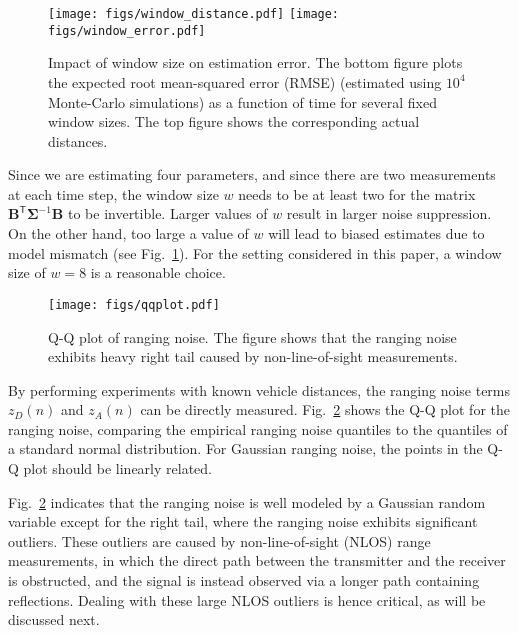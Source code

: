 \documentclass[12pt,journal,final,onecolumn]{IEEEtran}
\newcommand{\msf}[1]{\mathsf{#1}}
\newcommand{\T}{\msf{T}}
\theoremstyle{definition}
\theoremstyle{myremark}
\begin{document}
\begin{figure}[htbp]
    \centering 
    \texttt{[image: figs/window\_distance.pdf]} 
    \texttt{[image: figs/window\_error.pdf]} 

    \caption{Impact of window size on estimation error. The bottom figure plots
        the expected root mean-squared error (RMSE) (estimated using $10^4$
        Monte-Carlo simulations) as a function of time for several fixed window
        sizes. The top figure shows the corresponding actual distances.}
    \label{fig:window}
\end{figure}

Since we are estimating four parameters, and since there are two measurements at
each time step, the window size $w$ needs to be at least two for the matrix
$\bm{B}^\T\bm{\Sigma}^{-1}\bm{B}$ to be invertible. Larger values of $w$ result
in larger noise suppression. On the other hand, too large a value of $w$ will
lead to biased estimates due to model mismatch (see Fig.~\ref{fig:window}). For
the setting considered in this paper, a window size of $w = 8$ is a reasonable
choice.

\begin{figure}[htbp]
    \centering 
    \texttt{[image: figs/qqplot.pdf]} 

    \caption{Q-Q plot of ranging noise. The figure shows that the ranging noise
    exhibits heavy right tail caused by non-line-of-sight measurements.}
    \label{fig:qqplot}
\end{figure}

By performing experiments with known vehicle distances, the ranging noise terms
$z_D(n)$ and $z_A(n)$ can be directly measured. Fig.~\ref{fig:qqplot} shows the
Q-Q plot for the ranging noise, comparing the empirical ranging noise quantiles
to the quantiles of a standard normal distribution. For Gaussian ranging noise,
the points in the Q-Q plot should be linearly related. 

Fig.~\ref{fig:qqplot} indicates that the ranging noise is well modeled by a
Gaussian random variable except for the right tail, where the ranging noise
exhibits significant outliers. These outliers are caused by non-line-of-sight
(NLOS) range measurements, in which the direct path between the transmitter and
the receiver is obstructed, and the signal is instead observed via a longer path
containing reflections. Dealing with these large NLOS outliers is hence
critical, as will be discussed next.
\end{document}
